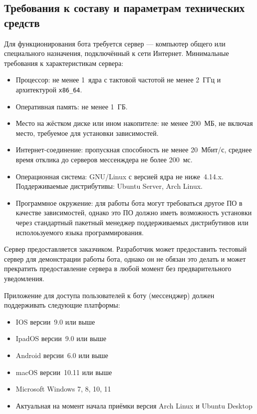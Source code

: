 \subsection{Требования к составу и параметрам технических средств}
\label{sec:req:hw}
Для функционирования бота требуется сервер --- компьютер общего или специального назначения,
подключённый к сети Интернет. Минимальные требования к характеристикам сервера:
\begin{itemize}
    \item
        Процессор: не менее 1~ядра с тактовой частотой не менее 2~ГГц и архитектурой
        \texttt{x86\_64}.
    \item
        Оперативная память: не менее 1~ГБ.
    \item
        Место на жёстком диске или ином накопителе: не менее 200~МБ, не включая место, требуемое
        для установки зависимостей.
    \item
        Интернет-соединение: пропускная способность не менее 20~Мбит/с, среднее время отклика
        до серверов мессенждера не более 200~мс.
    \item
        Операционная система: GNU/Linux с версией ядра не ниже~4.14.x.
        Поддерживаемые дистрибутивы: Ubuntu Server, Arch Linux.
    \item
        Программное окружение: для работы бота могут требоваться другое ПО в качестве зависимостей,
        однако это ПО должно иметь возможность установки через стандартный пакетный менеджер
        поддерживаемых дистрибутивов или исполоьзуемого языка программирования.
\end{itemize}
Сервер предоставляется заказчиком. Разработчик может предоставить тестовый сервер для демонстрации
работы бота, однако он не обязан это делать и может прекратить предоставление сервера в любой момент
без предварительного уведомления.

Приложение для доступа пользователей к боту (мессенджер) должен поддерживать следующие платформы:
\begin{itemize}
    \item
        IOS версии~9.0 или выше
    \item
        IpadOS версии~9.0 или выше
    \item
        Android версии~6.0 или выше
    \item
        macOS версии~10.11 или выше
    \item
        Microsoft Windows 7, 8, 10, 11
    \item
        Актуальная на момент начала приёмки версия Arch Linux и Ubuntu Desktop
\end{itemize}
